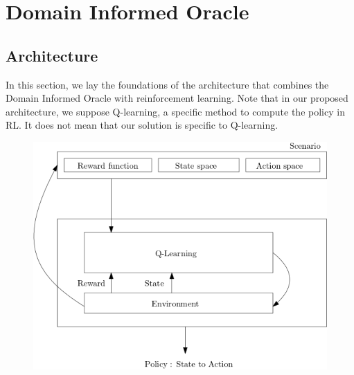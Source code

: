 \section{Domain Informed Oracle} 
\subsection{Architecture}
In this section, we lay the foundations of the architecture that combines the Domain Informed Oracle with 
reinforcement learning. Note that in our proposed architecture, we suppose Q-learning, a specific method to compute the policy in RL. 
It does not mean that our solution is specific to Q-learning. 

\medskip 

\begin{figure}[H]
  \centering
  \begin{minipage}{.5\textwidth}
    \centering
    \includegraphics[width=1\linewidth]{figures/basicrl.png}
    \label{fig:basicrl}
  \end{minipage}%
  \begin{minipage}{.45\textwidth}
    \centering

\end{minipage}
\end{figure}
